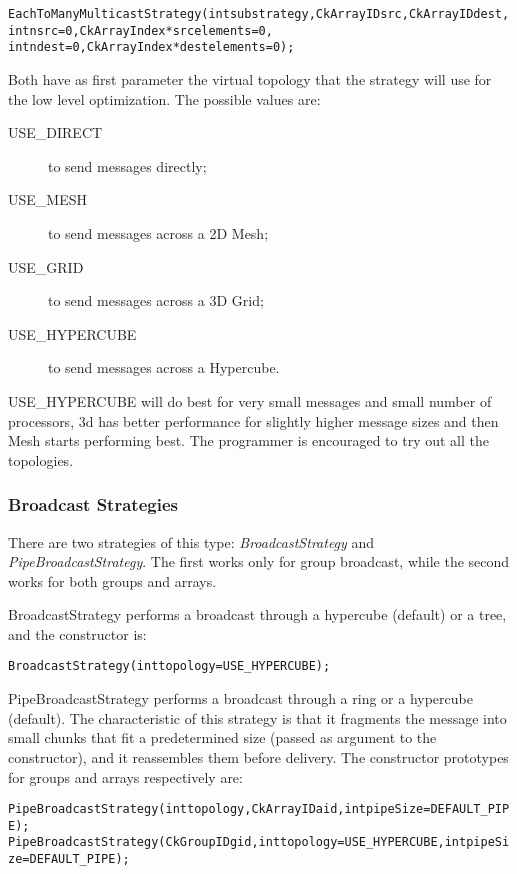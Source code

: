 {\begin{alltt}
EachToManyMulticastStrategy(int substrategy, CkArrayID src, CkArrayID dest,
                            int nsrc=0, CkArrayIndex *srcelements=0,
                            int ndest=0, CkArrayIndex *destelements=0);
\end{alltt}

Both have as first parameter the virtual topology that the strategy will use for
the low level optimization. The possible values are:

\begin{description}
\item[USE\_DIRECT] to send messages directly;
\item[USE\_MESH] to send messages across a 2D Mesh;
\item[USE\_GRID] to send messages across a 3D Grid;
\item[USE\_HYPERCUBE] to send messages across a Hypercube.
\end{description}

USE\_HYPERCUBE will do best for very small messages and small number of
processors, 3d has better performance for slightly higher message sizes and then
Mesh starts performing best. The programmer is encouraged to try out all the
topologies.


\subsubsection{Broadcast Strategies}

There are two strategies of this type: {\em BroadcastStrategy} and {\em
PipeBroadcastStrategy}. The first works only for group broadcast, while the
second works for both groups and arrays.

BroadcastStrategy performs a broadcast through a hypercube (default) or a tree,
and the constructor is:

\begin{alltt}
BroadcastStrategy(int topology=USE_HYPERCUBE);
\end{alltt}

PipeBroadcastStrategy performs a broadcast through a ring or a hypercube
(default). The characteristic of this strategy is that it fragments the message
into small chunks that fit a predetermined size (passed as argument to the
constructor), and it reassembles them before delivery. The constructor
prototypes for groups and arrays respectively are:

\begin{alltt}
PipeBroadcastStrategy(int topology, CkArrayID aid, int pipeSize=DEFAULT_PIPE);
PipeBroadcastStrategy(CkGroupID gid, int topology=USE_HYPERCUBE, int pipeSize=DEFAULT_PIPE);
\end{alltt}


}
